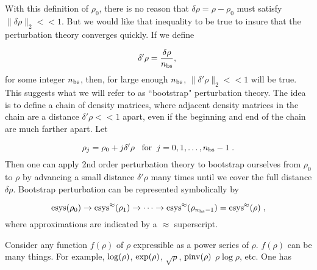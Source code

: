 \documentclass[12pt]{article}%
\newcommand{\beq}{\begin{equation}}
\newcommand{\eeq}{\end{equation}}
\newcommand{\rarrow}[0]{\rightarrow}
\newcommand{\nbs}[0]{{n_{\rm bs}}}
\newcommand{\norm}[1]{\parallel #1 \parallel_2}
\begin{document}
With this definition of $\rho_0$,
there is no reason that
$\delta \rho = \rho -\rho_0$
must satisfy
$\norm{\delta\rho}  << 1$.
But we would like that inequality to be true
to insure that the perturbation theory
converges quickly.
If we define

\beq
\delta'\rho = \frac{\delta\rho }{\nbs},
 \;
 \eeq
 for some integer $\nbs$, then,
 for large enough $\nbs$,
 $\norm{\delta'\rho} <<1$
 will be true. This suggests what we
 will refer to as
 ``bootstrap" perturbation theory.
 The idea is to define a chain of
 density matrices, where adjacent
density matrices in the chain are
 a distance
 $\delta'\rho<<1$ apart,
 even if the beginning and end
 of the chain are much farther apart.
 Let

 \beq
 \rho_j = \rho_0 + j \delta'\rho
 \;\;\;{\rm for} \;\;j=0, 1, \ldots, \nbs-1
 \;.
 \eeq
 Then one can apply 2nd order perturbation
 theory to
 bootstrap ourselves
from $\rho_0$ to $\rho$
by advancing a small distance
$\delta'\rho$ many times
until we cover the full distance
$\delta\rho$. Bootstrap perturbation
can be represented symbolically by


\beq
{\rm esys}(\rho_0)\rarrow
{\rm esys}^\approx(\rho_1)\rarrow\cdots\rarrow
{\rm esys}^\approx(\rho_{\nbs-1})=
{\rm esys}^\approx(\rho)
\;,
\eeq
where approximations
are indicated by a $\approx$
superscript.


Consider any function $f(\rho)$ of $\rho$
expressible as a power series of $\rho$.
$f(\rho)$ can be many things. For example,
${\rm log}(\rho)$, ${\rm exp}(\rho)$,
$\sqrt{\rho}$, ${\rm pinv}(\rho)$
$\rho\log\rho$, etc.
One has
\end{document}
